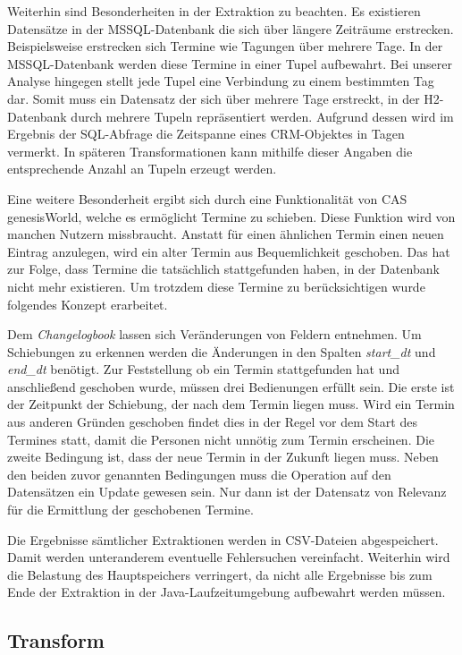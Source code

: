 Weiterhin sind Besonderheiten in der Extraktion zu beachten. Es existieren Datensätze in der MSSQL-Datenbank die sich über längere Zeiträume erstrecken. Beispielsweise erstrecken sich Termine wie Tagungen über mehrere Tage. In der MSSQL-Datenbank werden diese Termine in einer Tupel aufbewahrt. Bei unserer Analyse hingegen stellt jede Tupel eine Verbindung zu einem bestimmten Tag dar. Somit muss ein Datensatz der sich über mehrere Tage erstreckt, in der H2-Datenbank durch mehrere Tupeln repräsentiert werden. Aufgrund dessen wird im Ergebnis der SQL-Abfrage die Zeitspanne eines CRM-Objektes in Tagen vermerkt. In späteren Transformationen kann mithilfe dieser Angaben die entsprechende Anzahl an Tupeln erzeugt werden.

Eine weitere Besonderheit ergibt sich durch eine Funktionalität von CAS genesisWorld, welche es ermöglicht Termine zu schieben. Diese Funktion wird von manchen Nutzern missbraucht. Anstatt für einen ähnlichen Termin einen neuen Eintrag anzulegen, wird ein alter Termin aus Bequemlichkeit geschoben. Das hat zur Folge, dass Termine die tatsächlich stattgefunden haben, in der Datenbank nicht mehr existieren. Um trotzdem diese Termine zu berücksichtigen wurde folgendes Konzept erarbeitet. 

Dem \textit{Changelogbook} lassen sich Veränderungen von Feldern entnehmen. Um Schiebungen zu erkennen werden die Änderungen in den Spalten \textit{start\_dt} und \textit{end\_dt} benötigt. Zur Feststellung ob ein Termin stattgefunden hat und anschließend geschoben wurde, müssen drei Bedienungen erfüllt sein. Die erste ist der Zeitpunkt der Schiebung, der nach dem Termin liegen muss. Wird ein Termin aus anderen Gründen geschoben findet dies in der Regel vor dem Start des Termines statt, damit die Personen nicht unnötig zum Termin erscheinen. Die zweite Bedingung ist, dass der neue Termin in der Zukunft liegen muss. Neben den beiden zuvor genannten Bedingungen muss die Operation auf den Datensätzen ein Update gewesen sein. Nur dann ist der Datensatz von Relevanz für die Ermittlung der geschobenen Termine. 

Die Ergebnisse sämtlicher Extraktionen werden in CSV-Dateien abgespeichert. Damit werden unteranderem eventuelle Fehlersuchen vereinfacht. Weiterhin wird die Belastung des Hauptspeichers verringert, da nicht alle Ergebnisse bis zum Ende der Extraktion in der Java-Laufzeitumgebung aufbewahrt werden müssen.

\subsection{Transform}

